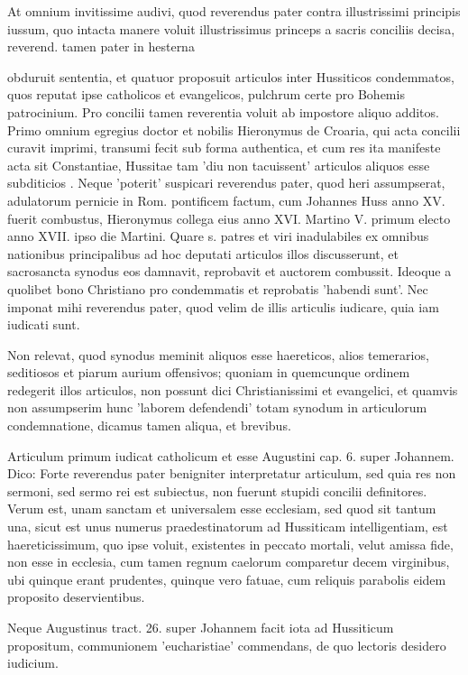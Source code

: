 At omnium invitissime audivi, quod reverendus pater contra illustrissimi principis iussum, quo intacta manere voluit illustrissimus princeps a sacris conciliis decisa, reverend. tamen pater in hesterna

obduruit sententia, et quatuor proposuit articulos inter Hussiticos condemmatos, quos reputat ipse catholicos et evangelicos, pulchrum certe pro Bohemis patrocinium. Pro concilii tamen reverentia voluit ab impostore aliquo additos. Primo omnium egregius doctor et nobilis Hieronymus de Croaria, qui acta concilii curavit imprimi, transumi fecit sub forma authentica, et cum res ita manifeste acta sit Constantiae, Hussitae tam 'diu non tacuissent' articulos aliquos esse subditicios \marginpar{\small[295]}. Neque 'poterit' suspicari reverendus pater, quod heri assumpserat, adulatorum pernicie in Rom. pontificem factum, cum Johannes Huss anno XV. fuerit combustus, Hieronymus collega eius anno XVI. Martino V. primum electo anno XVII. ipso die Martini. Quare s. patres et viri inadulabiles ex omnibus nationibus principalibus ad hoc deputati articulos illos discusserunt, et sacrosancta synodus eos damnavit, reprobavit et auctorem combussit. Ideoque a quolibet bono Christiano pro condemmatis et reprobatis 'habendi sunt'. Nec imponat mihi reverendus pater, quod velim de illis articulis iudicare, quia iam iudicati sunt.

Non relevat, quod synodus meminit aliquos esse haereticos, alios temerarios, seditiosos et piarum aurium offensivos; quoniam in quemcunque ordinem redegerit illos articulos, non possunt dici Christianissimi et evangelici, et quamvis non assumpserim hunc 'laborem defendendi' totam synodum in articulorum condemnatione, dicamus tamen aliqua, et brevibus.

Articulum primum iudicat catholicum et esse Augustini cap. 6. super Johannem. Dico: Forte reverendus pater benigniter interpretatur articulum, sed quia res non sermoni, sed sermo rei est subiectus, non fuerunt stupidi concilii definitores. Verum est, unam sanctam et universalem esse ecclesiam, sed quod sit tantum una, sicut est unus numerus praedestinatorum ad Hussiticam intelligentiam, est haereticissimum, quo ipse voluit, existentes in peccato mortali, velut amissa fide, non esse in ecclesia, cum tamen regnum caelorum comparetur decem virginibus, ubi quinque erant prudentes, quinque vero fatuae, cum reliquis parabolis eidem proposito deservientibus.

Neque Augustinus tract. 26. super Johannem facit iota ad Hussiticum propositum, communionem 'eucharistiae' commendans, de quo lectoris desidero iudicium.

